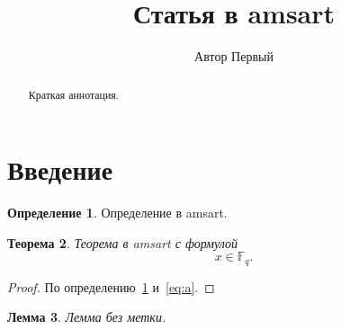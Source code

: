 \documentclass[12pt]{amsart}
\title{Статья в amsart}
\author{Автор Первый}
\theoremstyle{plain}
\newtheorem{theorem}{Теорема}[section]
\newtheorem{lemma}[theorem]{Лемма}
\theoremstyle{definition}
\newtheorem{definition}[theorem]{Определение}
\numberwithin{equation}{section}
\begin{document}
\begin{abstract}
Краткая аннотация.
\end{abstract}

\maketitle

\section{Введение}

\begin{definition}\label{def:a}
Определение в amsart.
\end{definition}

\begin{theorem}\label{thm:a}
Теорема в amsart с формулой
\begin{equation}\label{eq:a}
  x \in \mathbb{F}_q .
\end{equation}
\end{theorem}

\begin{proof}
По определению~\ref{def:a} и~\eqref{eq:a}.
\end{proof}

\begin{lemma}
Лемма без метки.
\end{lemma}
\end{document}
